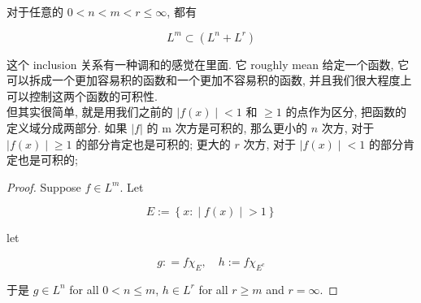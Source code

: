 \begin{proposition}{}

对于任意的 \(0 < n < m < r \leq \infty\), 都有

\[L^{m} \subset (L^{n} + L^{r})\]

\end{proposition}

这个 inclusion 关系有一种调和的感觉在里面. 它 roughly mean 给定一个函数, 它可以拆成一个更加容易积的函数和一个更加不容易积的函数, 并且我们很大程度上可以控制这两个函数的可积性.\\
但其实很简单, 就是用我们之前的 \(\left. |f(x) \middle| < 1 \right.\) 和 \(\geq 1\) 的点作为区分, 把函数的定义域分成两部分. 如果 \(|f|\) 的 m 次方是可积的, 那么更小的 \(n\) 次方, 对于 \(\left. |f(x) \middle| \geq 1 \right.\) 的部分肯定也是可积的; 更大的 \(r\) 次方, 对于 \(\left. |f(x) \middle| < 1 \right.\) 的部分肯定也是可积的;

\begin{proof}

Suppose \(f \in L^{m}\). Let

\[E := \left\{ x: \middle| f(x) \middle| > 1 \right\}\]

let

\[g: = f\chi_{E},\quad h := f\chi_{E^{c}}\]

于是 \(g \in L^{n}\) for all \(0 < n \leq m\), \(h \in L^{r}\) for all \(r \geq m\) and \(r = \infty\).

\end{proof}

